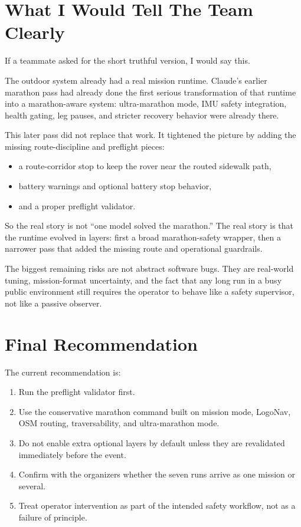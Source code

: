 \documentclass[11pt]{article}
\begin{document}
\section{What I Would Tell The Team Clearly}
If a teammate asked for the short truthful version, I would say this.

The outdoor system already had a real mission runtime. Claude's earlier marathon pass had already done the first serious transformation of that runtime into a marathon-aware system: ultra-marathon mode, IMU safety integration, health gating, leg pauses, and stricter recovery behavior were already there.

This later pass did not replace that work. It tightened the picture by adding the missing route-discipline and preflight pieces:
\begin{itemize}[leftmargin=*]
\item a route-corridor stop to keep the rover near the routed sidewalk path,
\item battery warnings and optional battery stop behavior,
\item and a proper preflight validator.
\end{itemize}

So the real story is not ``one model solved the marathon.'' The real story is that the runtime evolved in layers: first a broad marathon-safety wrapper, then a narrower pass that added the missing route and operational guardrails.

The biggest remaining risks are not abstract software bugs. They are real-world tuning, mission-format uncertainty, and the fact that any long run in a busy public environment still requires the operator to behave like a safety supervisor, not like a passive observer.

\section{Final Recommendation}
The current recommendation is:
\begin{enumerate}[leftmargin=*]
\item Run the preflight validator first.
\item Use the conservative marathon command built on mission mode, LogoNav, OSM routing, traversability, and ultra-marathon mode.
\item Do not enable extra optional layers by default unless they are revalidated immediately before the event.
\item Confirm with the organizers whether the seven runs arrive as one mission or several.
\item Treat operator intervention as part of the intended safety workflow, not as a failure of principle.
\end{enumerate}
\end{document}
